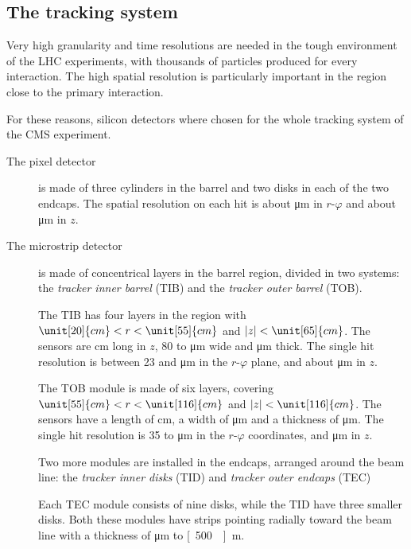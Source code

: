 \subsection{The tracking system}
Very high granularity and time resolutions are needed in the tough
environment of the LHC experiments, with thousands of particles produced
for every interaction. The high spatial resolution is particularly important
in the region close to the primary interaction.

For these reasons, silicon detectors where chosen for the whole tracking
system of the CMS experiment.

\begin{description}
    \item[The pixel detector] is made of three cylinders in the barrel and
        two disks in each of the two endcaps. The spatial resolution on each
        hit is about \unit[10]{\micro m} in $r$-$\varphi$ and about
        \unit[20]{\micro m} in $z$.
    \item[The microstrip detector] is made of concentrical layers in the
        barrel region, divided in two systems: the \emph{tracker inner
        barrel} (TIB) and the \emph{tracker outer barrel} (TOB).

        The TIB has four layers in the region with $\unit[20]{cm} < r <
        \unit[55]{cm}$ and $|z| < \unit[65]{cm}$. The sensors are
        \unit[10]{cm} long in $z$, 80 to \unit[120]{\micro m} wide and
        \unit[320]{\micro m} thick. The single hit resolution is between 23
        and \unit[34]{\micro m} in the $r$-$\varphi$ plane, and about
        \unit[230]{\micro m} in $z$.

        The TOB module is made of six layers, covering
        $\unit[55]{cm} < r < \unit[116]{cm}$ and $|z| <
        \unit[116]{cm}$. The sensors have a length of \unit[25]{cm}, a width
        of \unit[180]{\micro m} and a thickness of \unit[500]{\micro m}. The
        single hit resolution is 35 to \unit[52]{\micro m} in the
        $r$-$\varphi$ coordinates, and \unit[530]{\micro m} in $z$.

        Two more modules are installed in the endcaps, arranged around the
        beam line: the \emph{tracker inner
        disks} (TID) and \emph{tracker outer endcaps} (TEC)

        Each TEC module consists of nine disks, while the TID have three
        smaller disks. Both these modules have strips pointing radially
        toward the beam line with a thickness of \unit[320]{\micro m} to
        \unit[500 \micro]{m}.
\end{description}

